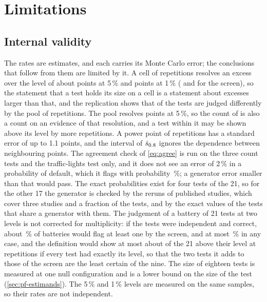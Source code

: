 \section{Limitations}
\label{sec:limitations}

\subsection{Internal validity}
\label{sec:li-internal}

The rates are estimates, and each carries its Monte Carlo error; the conclusions that follow from them are limited by it.
A cell of \nNullReps{} repetitions resolves an excess over the level of about \detIntFiveFour{} points at 5\,\% and \detIntOneFour{} points at 1\,\% (\detFiveFour{} and \detOneFour{} for the screen), so the statement that a test holds its size on a cell is a statement about excesses larger than that, and the replication shows that \nVerdictDisagree{} of the \nTests{} tests are judged differently by the pool of \nRepsPooled{} repetitions.
The pool resolves \detIntFiveTwoHundredK{} points at 5\,\%, so the count of \nHold{} is also a count on an evidence of that resolution, and a test within it may be shown above its level by more repetitions.
A power point of \nPowerReps{} repetitions has a standard error of up to 1.1 points, and the interval of $\hat{s}_{0.8}$ ignores the dependence between neighbouring points.
The agreement check of \eqref{eq:agree} is run on the three count tests and the traffic-lights test only, and it does not see an error of 2\,\% in a probability of default, which it flags with probability \agFailTwoPercent\,\%; a generator error smaller than that would pass.
The exact probabilities exist for four tests of the 21, so for the other 17 the generator is checked by the reruns of published studies, which cover three studies and a fraction of the tests, and by the exact values of the tests that share a generator with them.
The judgement of a battery of 21 tests at two levels is not corrected for multiplicity: if the tests were independent and correct, about \flagFamily\,\% of batteries would flag at least one by the screen, and at most \flagUnion\,\% in any case, and the definition would show at most about \expFalseAbove{} of the 21 above their level at \nRepsPooled{} repetitions if every test had exactly its level, so that the two tests it adds to those of the screen are the least certain of the nine.
The size of eighteen tests is measured at one null configuration and is a lower bound on the size of the test (\cref{sec:pf-estimands}).
The 5\,\% and 1\,\% levels are measured on the same samples, so their rates are not independent.

